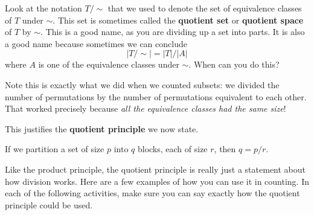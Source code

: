 \documentclass[10pt,]{book}
\newcommand{\terminology}[1]{\textbf{#1}}
\theoremstyle{plain}
\theoremstyle{definition}
\theoremstyle{definition}
\theoremstyle{definition}
\theoremstyle{definition}
\numberwithin{equation}{chapter}
\begin{document}
\par
\hypertarget{p-663}{}%
Look at the notation \(T/\sim\) that we used to denote the set of equivalence classes of \(T\) under \(\sim\).  This set is sometimes called the \terminology{quotient set} or \terminology{quotient space} of \(T\) by \(\sim\).  This is a good name, as you are dividing up a set into parts.  It is also a good name because sometimes we can conclude%
\begin{equation*}
|T/\sim| = |T|/|A|
\end{equation*}
where \(A\) is one of the equivalence classes under \(\sim\).  When can you do this?%
\par
\hypertarget{p-664}{}%
Note this is exactly what we did when we counted subsets: we divided the number of permutations by the number of permutations equivalent to each other.  That worked precisely because \emph{all the equivalence classes had the same size}!%
\par
\hypertarget{p-665}{}%
This justifies the \terminology{quotient principle} we now state.%
\begin{assemblage}\label{assemblage-quotientprinciple}
\hypertarget{p-666}{}%
If we partition a set of size \(p\) into \(q\) blocks, each of size \(r\), then \(q = p/r\).%
\end{assemblage}
\hypertarget{p-667}{}%
Like the product principle, the quotient principle is really just a statement about how division works.  Here are a few examples of how you can use it in counting.  In each of the following activities, make sure you can say exactly how the quotient principle could be used.%
\end{document}
